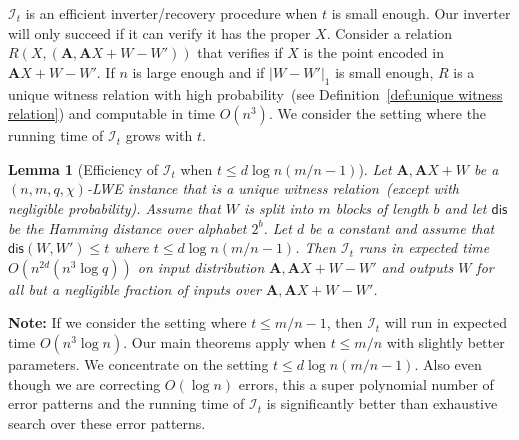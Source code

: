 \documentclass[11pt]{article}
\newcommand{\defref}[1]{\mbox{Definition~\ref{#1}}}
\newcommand{\lemref}[1]{\mbox{Lemma~\ref{#1}}}
\newcommand{\vect}[1]{\ensuremath{\textbf{#1}}}
\newcommand{\dis}{\ensuremath{\mathsf{dis}}}
\newtheorem{lemma}[theorem]{Lemma}
\newcommand{\authnote}[2]{{\textcolor{red}{\textsf{#1 notes: }\textcolor{blue}{ #2}}\marginpar{\textcolor{red}{\textbf{!!!!!}}}}}
\newcommand{\authnote}[2]{}
\newcommand{\lnote}[1]{{\authnote{Leo}{#1}}}
\newcommand{\vA}{\vect{A}}
\begin{document}
$\mathcal{I}_t$ is an efficient inverter/recovery procedure when $t$ is small enough.  Our inverter will only succeed if it can verify it has the proper $X$. Consider a relation $R(X, (\vA, \vA X+W-W'))$ that verifies if $X$ is the point encoded in $\vA X+W-W'$.   If $n$ is large enough and if $|W-W'|_1$ is small enough, $R$ is a unique witness relation with high probability~(see \defref{def:unique witness relation}) and computable in time $O(n^3)$.
We consider the setting where the running time of $\mathcal{I}_t$ grows with $t$.
\begin{lemma}[Efficiency of $\mathcal{I}_t$ when $t\leq d\log n (m/n-1)$]
\label{lem:i t poly time}
Let $\vA, \vA X+W$ be a  $(n,m, q, \chi)$-LWE instance that is a unique witness relation~(except with negligible probability).  Assume that $W$ is split into $m$ blocks of length $b$ and let $\dis$ be the Hamming distance over alphabet $2^b$.  Let $d$ be a constant and assume that $\dis(W, W')\leq t$ where $t\leq d\log n(m/n-1)$.  Then $\mathcal{I}_t$ runs in expected time $O(n^{2d}(n^3\log q))$ on input distribution $\vA, \vA X+W - W'$ and outputs $W$ for all but a negligible fraction of inputs over $\vA, \vA X+W - W'$.
\end{lemma}
\textbf{Note:} If we consider the setting where $t\leq m/n-1$, then $\mathcal{I}_t$ will run in expected time $O(n^3\log n)$.  Our main theorems apply when $t\leq m/n$ with slightly better parameters.  We concentrate on the setting $t\leq d\log n(m/n-1)$.  Also even though we are correcting $O(\log n)$ errors, this a super polynomial number of error patterns and the running time of $\mathcal{I}_t$ is significantly better than exhaustive search over these error patterns.
\end{document}
